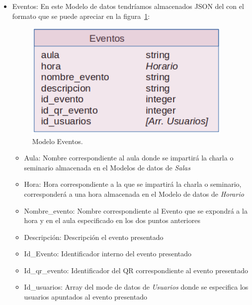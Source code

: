 \documentclass[a4paper, 12pt]{book}
\begin{document}
\begin{itemize}
	\item Eventos: En este Modelo de datos tendríamos almacenados JSON del con el formato que se puede apreciar en la figura~\ref{fig:mongoDBEventos}:
	\begin{figure}
  	\centering
  	\includegraphics[width=10cm, keepaspectratio]{img/mongoDBEventos.png}
  	\caption{Modelo Eventos.}\label{fig:mongoDBEventos}
	\end{figure}
		\begin{itemize}
		\item Aula: Nombre correspondiente al aula donde se impartirá la charla o seminario almacenada en el Modelos de datos de \textit{Salas}
		\item Hora: Hora correspondiente a la que se impartirá la charla o seminario, corresponderá a una hora almacenada en el Modelo de datos de \textit{Horario}
		\item Nombre\_evento: Nombre correspondiente al Evento que se expondrá a la hora y en el aula especificado en los dos puntos anteriores
		\item Descripción: Descripción el evento presentado
		\item Id\_Evento: Identificador interno del evento presentado
		\item Id\_qr\_evento: Identificador del QR correspondiente al evento presentado
		\item Id\_usuarios: Array del mode de datos de \textit{Usuarios} donde se especifica los usuarios apuntados al evento presentado
		\end{itemize}
		

\end{itemize}
\end{document}
